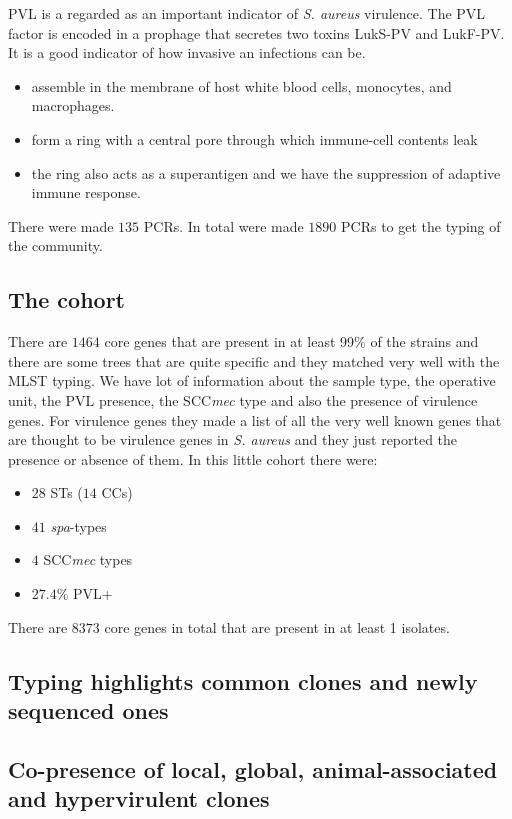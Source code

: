 PVL is a regarded as an important indicator of \emph{S. aureus} virulence. The PVL factor is encoded in a prophage that secretes two toxins LukS-PV and LukF-PV. It is a good indicator of how invasive an infections can be.

\begin{itemize}
    \item assemble in the membrane of host white blood cells, monocytes, and macrophages. 
    \item form a ring with a central pore through which immune-cell contents leak
    \item the ring also acts as a superantigen and we have the suppression of adaptive immune response. 
\end{itemize}

There were made $135$ PCRs.
In total were made $1890$ PCRs to get the typing of the community. 

\subsection{The cohort}

There are $1464$ core genes that are present in at least 99$\%$ of the strains and there are some trees that are quite specific and they matched very well with the MLST typing. We have lot of information about the sample type, the operative unit, the PVL presence, the SCC\emph{mec} type and also the presence of virulence genes. For virulence genes they made a list of all the very well known genes that are thought to be virulence genes in \textit{S. aureus} and they just reported the presence or absence of them. In this little cohort there were:

\begin{itemize}
    \item $28$ STs ($14$ CCs)
    \item $41$ \emph{spa}-types
    \item $4$ SCC\emph{mec} types 
    \item $27.4\%$ PVL+
\end{itemize}

There are $8373$ core genes in total that are present in at least 1 isolates.
  
\subsection{Typing highlights common clones and newly sequenced ones}

\subsection{Co-presence of local, global, animal-associated and hypervirulent clones}

